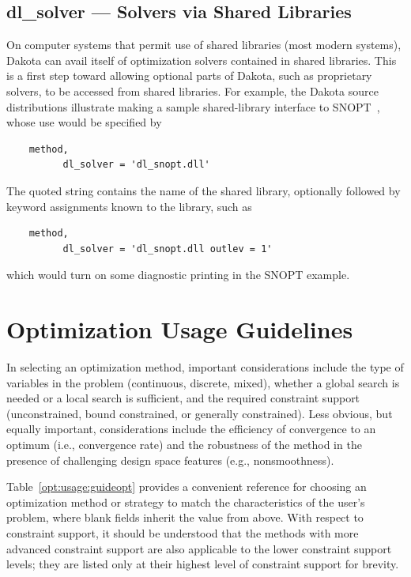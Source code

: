 \subsection{dl\_solver --- Solvers via Shared Libraries}
\label{opt:additional:dlsolver}

On computer systems that permit use of shared libraries (most modern
systems), Dakota can avail itself of optimization solvers contained in
shared libraries.  This is a first step toward allowing optional parts
of Dakota, such as proprietary solvers, to be accessed from shared
libraries. For example, the Dakota source distributions illustrate
making a sample shared-library interface to SNOPT~\cite{GilMS05},
whose use would be specified by
\begin{small}
\begin{verbatim}
    method,
          dl_solver = 'dl_snopt.dll'
\end{verbatim}
\end{small}
The quoted string contains the name of the shared library, optionally
followed by keyword assignments known to the library, such as
\begin{small}
\begin{verbatim}
    method,
          dl_solver = 'dl_snopt.dll outlev = 1'
\end{verbatim}
\end{small}
which would turn on some diagnostic printing in the SNOPT example.

\section{Optimization Usage Guidelines}
\label{opt:usage}

In selecting an optimization method, important considerations include
the type of variables in the problem (continuous, discrete, mixed),
whether a global search is needed or a local search is sufficient, and
the required constraint support (unconstrained, bound constrained, or
generally constrained). Less obvious, but equally important,
considerations include the efficiency of convergence to an optimum
(i.e., convergence rate) and the robustness of the method in the
presence of challenging design space features (e.g., nonsmoothness).

Table~\ref{opt:usage:guideopt} provides a convenient reference for
choosing an optimization method or strategy to match the
characteristics of the user's problem, where blank fields inherit the
value from above. With respect to constraint support, it should be
understood that the methods with more advanced constraint support are
also applicable to the lower constraint support levels; they are
listed only at their highest level of constraint support for brevity.


